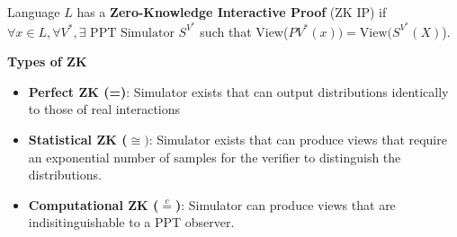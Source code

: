 \documentclass[11pt]{article}
\begin{document}
Language $L$ has a \textbf{Zero-Knowledge Interactive Proof} (ZK IP) if $\forall x \in L, \forall V^*, \exists \text{ PPT Simulator } S^{V^*}$ such that View($PV^*(x)) = \text{View}(S^{V^*}(X)$).
\vspace{1em}

\textbf{Types of ZK}
\begin{itemize}
    \item \textbf{Perfect ZK (=)}: Simulator exists that can output distributions identically to those of real interactions
    \item \textbf{Statistical ZK ($\cong)$}: Simulator exists that can produce views that require an exponential number of samples for the verifier to distinguish the distributions. 
    \item \textbf{Computational ZK ($\overset{c}{=}$)}: Simulator can produce views that are indisitinguishable to a PPT observer.
\end{itemize}
\end{document}
